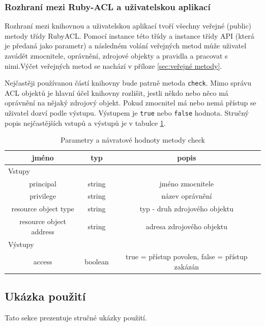 
\subsubsection{Rozhraní mezi Ruby-ACL a uživatelskou aplikací}
Rozhraní mezi knihovnou a uživatelskou aplikací tvoří všechny veřejné (public) metody třídy RubyACL. Pomocí instance této třídy a instance třídy API (která je předaná jako parametr) a následném volání veřejných metod může uživatel zavádět zmocnitele, oprávnění, zdrojové objekty a pravidla a pracovat s nimi.Výčet veřejných metod se nachází v příloze \ref{sec:veřejné metody}.

Nejčastěji používanou částí knihovny bude patrně metoda \verb|check|. Mimo správu ACL objektů je hlavní účel knihovny rozlišit, jestli někdo nebo něco má oprávnění na nějaký zdrojový objekt. Pokud zmocnitel má nebo nemá přístup se uživatel dozví podle výstupu. Výstupem je \verb|true| nebo \verb|false| hodnota. Stručný popis nejčastějších vstupů a výstupů je v tabulce \ref{tab:tab3}.

\begin{table}%
\centering
\begin{tabular}{|c|c|c|}
\hline
\textbf{jméno} & \textbf{typ} & \textbf{popis}\\
\hline
\multicolumn{3}{|l|}{Vstupy} \\
\hline
principal & string & jméno zmocnitele\\
\hline
privilege & string & název oprávnění\\
\hline
resource object type & string & typ - druh zdrojového objektu\\
\hline
resource object address & string & adresa zdrojového objektu\\
\hline
\hline
\multicolumn{3}{|l|}{Výstupy} \\
\hline
access & boolean & true = přístup povolen, false = přístup zakázán\\
\hline
\end{tabular}
\caption{Parametry a návratové hodnoty metody check} %
\label{tab:tab3}
\end{table}


\subsection{Ukázka použití}
\label{Ukázka použití}
Tato sekce prezentuje stručné ukázky použití.

